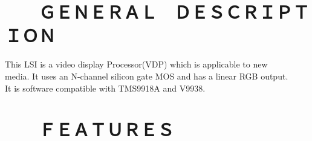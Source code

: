 \documentclass[a4paper,10pt]{article}
\begin{document}
\newpage

\setcounter{page}{0}

\renewcommand\contentsname{\hskip 9em ＴＡＢＬＥ　ＯＦ　ＣＯＮＴＥＮＴＳ}
\makeatletter
\renewcommand*{\@dotsep}{-2}
\makeatother
\tableofcontents

\newpage

\setcounter{page}{1}
\fancyfoot[C]{\Large \thepage}

\section*{　　ＧＥＮＥＲＡＬ　ＤＥＳＣＲＩＰＴＩＯＮ}

\noindent This LSI is a video display Processor(VDP) which is applicable to new\\
media. It uses an N-channel silicon gate MOS and has a linear RGB output.\\
It is software compatible with TMS9918A and V9938.\\

\section*{　　ＦＥＡＴＵＲＥＳ}
\end{document}

